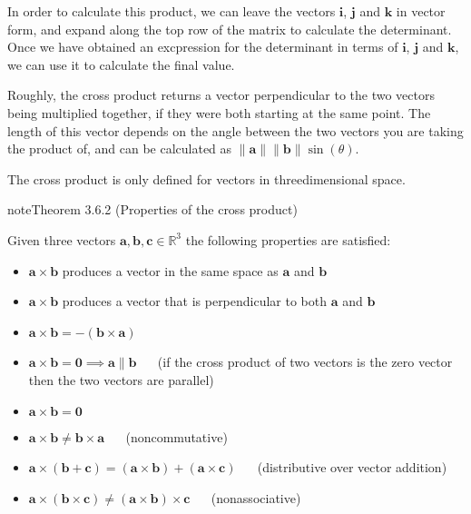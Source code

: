 \documentclass[letterpaper,10pt,english]{jupyterBook}
\begin{document}
\sphinxAtStartPar
In order to calculate this product, we can leave the vectors \(\mathbf{i}\), \(\mathbf{j}\) and \(\mathbf{k}\) in vector form, and expand along the top row of the matrix to calculate the determinant. Once we have obtained an excpression for the determinant in terms of \(\mathbf{i}\), \(\mathbf{j}\) and \(\mathbf{k}\), we can use it to calculate the final value.

\sphinxAtStartPar
Roughly, the cross product returns a vector perpendicular to the two vectors being multiplied together, if they were both starting at the same point. The length of this vector depends on the angle between the two vectors you are taking the product of, and can be calculated as \(\|\mathbf{a}\| \|\mathbf{b}\| \sin(\theta)\).

\sphinxAtStartPar
The cross product is only defined for vectors in three\sphinxhyphen{}dimensional space.
\label{_pages/3.3_Dot_and_cross_products:cross-product-properties-theorem}
\begin{sphinxadmonition}{note}{Theorem 3.6.2 (Properties of the cross product)}



\sphinxAtStartPar
Given three vectors \(\mathbf{a}, \mathbf{b}, \mathbf{c} \in \mathbb{R}^3\) the following properties are satisfied:
\begin{itemize}
\item {} 
\sphinxAtStartPar
\(\mathbf{a}\times \mathbf{b}\) produces a vector in the same space as \(\mathbf{a}\) and \(\mathbf{b}\)

\item {} 
\sphinxAtStartPar
\(\mathbf{a}\times \mathbf{b}\) produces a vector that is perpendicular to both \(\mathbf{a}\) and \(\mathbf{b}\)

\item {} 
\sphinxAtStartPar
\(\mathbf{a} \times \mathbf{b} = -(\mathbf{b} \times \mathbf{a})\)  

\item {} 
\sphinxAtStartPar
\(\mathbf{a}\times \mathbf{b} = \mathbf{0} \implies \mathbf{a} \parallel \mathbf{b}\)   (if the cross product of two vectors is the zero vector then the two vectors are parallel)

\item {} 
\sphinxAtStartPar
\(\mathbf{a} \times \mathbf{b} = \mathbf{0}\)

\item {} 
\sphinxAtStartPar
\(\mathbf{a} \times \mathbf{b} \neq \mathbf{b} \times \mathbf{a}\)   (non\sphinxhyphen{}commutative)

\item {} 
\sphinxAtStartPar
\(\mathbf{a} \times (\mathbf{b} + \mathbf{c}) = (\mathbf{a} \times \mathbf{b}) + (\mathbf{a} \times \mathbf{c})\)   (distributive over vector addition)

\item {} 
\sphinxAtStartPar
\(\mathbf{a} \times (\mathbf{b} \times \mathbf{c}) \neq (\mathbf{a} \times \mathbf{b}) \times \mathbf{c}\)   (non\sphinxhyphen{}associative)

\end{itemize}
\end{sphinxadmonition}
\end{document}
